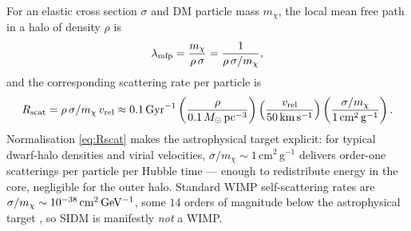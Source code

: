 \documentclass[12pt]{article}
\newcommand{\cmg}{\,\mathrm{cm^2\,g^{-1}}}
\newcommand{\kms}{\,\mathrm{km\,s^{-1}}}
\newcommand{\smx}{\sigma/m_\chi}
\newcommand{\vrel}{v_{\rm rel}}
\newcommand{\mfp}{\lambda_{\rm mfp}}
\begin{document}
For an elastic cross section $\sigma$ and DM particle mass $m_\chi$,
the local mean free path in a halo of density $\rho$ is
%
\begin{equation}
  \mfp = \frac{m_\chi}{\rho\,\sigma} = \frac{1}{\rho\,\smx},
\end{equation}
%
and the corresponding scattering rate per particle is
%
\begin{equation}
  R_{\rm scat} = \rho\,\smx\,v_{\rm rel}
    \approx 0.1\,{\rm Gyr}^{-1}
      \left(\frac{\rho}{0.1\,M_\odot\,{\rm pc}^{-3}}\right)
      \left(\frac{\vrel}{50\kms}\right)
      \left(\frac{\smx}{1\cmg}\right).
  \label{eq:Rscat}
\end{equation}
%
Normalisation \eqref{eq:Rscat} makes the astrophysical target
explicit: for typical dwarf-halo densities and virial velocities,
$\smx \sim 1\cmg$ delivers order-one scatterings per particle per
Hubble time --- enough to redistribute energy in the core, negligible
for the outer halo.  Standard WIMP self-scattering rates are
$\smx \sim 10^{-38}\,{\rm cm^2\,GeV^{-1}}$, some $14$ orders of magnitude
below the astrophysical target \citep{TulinYu2018}, so SIDM is
manifestly \emph{not} a WIMP.
\end{document}
